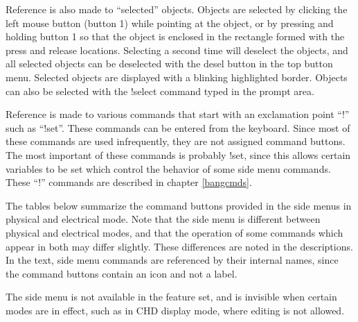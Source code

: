 Reference is also made to ``selected'' objects.  Objects are selected
by clicking the left mouse button (button 1) while pointing at the
object, or by pressing and holding button 1 so that the object is
enclosed in the rectangle formed with the press and release locations. 
Selecting a second time will deselect the objects, and all selected
objects can be deselected with the {\cb desel} button in the top
button menu.  Selected objects are displayed with a blinking
highlighted border.  Objects can also be selected with the {\cb
!select} command typed in the prompt area.

Reference is made to various commands that start with an exclamation
point ``{\cb !}'' such as ``{\cb !set}''.  These commands can be
entered from the keyboard.  Since most of these commands are used
infrequently, they are not assigned command buttons.  The most
important of these commands is probably {\cb !set}, since this allows
certain variables to be set which control the behavior of some side
menu commands.  These ``{\cb !}'' commands are described in chapter
\ref{bangcmds}.

The tables below summarize the command buttons provided in the side
menus in physical and electrical mode.  Note that the side menu is
different between physical and electrical modes, and that the
operation of some commands which appear in both may differ slightly. 
These differences are noted in the descriptions.  In the text, side
menu commands are referenced by their internal names, since the
command buttons contain an icon and not a label.

The side menu is not available in the {\Xiv} feature set, and is
invisible when certain modes are in effect, such as in CHD display
mode, where editing is not allowed.

